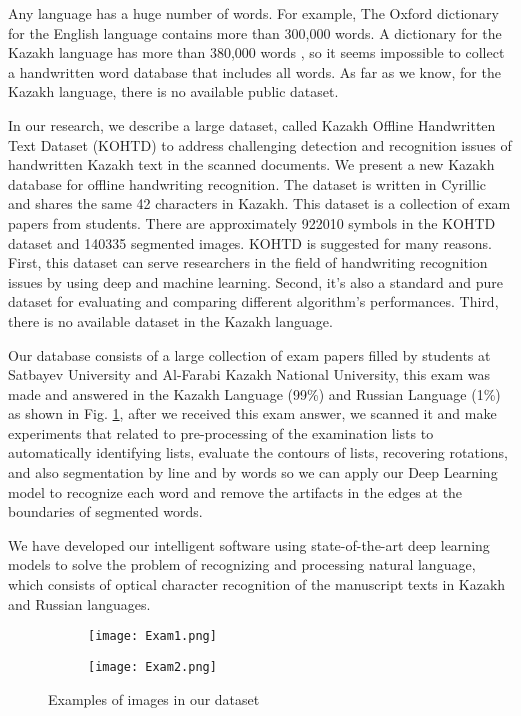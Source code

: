 \documentclass[preprint,12pt]{elsarticle}
\begin{document}
 Any language has a huge number of words. For example, The Oxford dictionary for the English language contains more than 300,000 words. A dictionary for the Kazakh language has more than 380,000 words \cite{sozdikqor}, so it seems impossible to collect a handwritten word database that includes all words. As far as we know,  for the Kazakh language, there is no available public dataset.


In our research, we describe a large dataset, called Kazakh Offline Handwritten Text Dataset (KOHTD) to address challenging detection and recognition issues of handwritten Kazakh text in the scanned documents. We present a new Kazakh database for offline handwriting recognition. The dataset is written in Cyrillic and shares the same 42 characters in Kazakh. This dataset is a collection of exam papers from students. There are approximately 922010 symbols in the KOHTD dataset and 140335 segmented images. KOHTD is suggested for many reasons. First, this dataset can serve researchers in the field of handwriting recognition issues by using deep and machine learning.  Second, it’s also a standard and pure dataset for evaluating and comparing different algorithm’s performances. Third, there is no available dataset in the Kazakh language.
 
Our database consists of a large collection of exam papers filled by students at Satbayev University and Al-Farabi Kazakh National University, this exam was made and answered in the Kazakh Language (99\%) and Russian Language (1\%) as shown in Fig. \ref{fig:examples_images}, after we received this exam answer, we scanned it and make experiments that related to pre-processing of the examination lists to automatically identifying lists, evaluate the contours of lists, recovering rotations, and also segmentation by line and by words so we can apply our Deep Learning model to recognize each word and remove the artifacts in the edges at the boundaries of segmented words.

We have developed our intelligent software using state-of-the-art deep learning models to solve the problem of recognizing and processing natural language, which consists of optical character recognition of the manuscript texts in Kazakh and Russian languages.

\begin{figure}[h!]
    \begin{subfigure}{0.50\columnwidth}
        \texttt{[image: Exam1.png]}
        \caption{}
\end{subfigure}
    \begin{subfigure}{0.50\columnwidth}
        \texttt{[image: Exam2.png]}
        \caption{}
\end{subfigure}
\caption{Examples of images in our dataset} 
\label{fig:examples_images}
\end{figure} 
\end{document}
